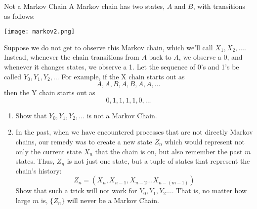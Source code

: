 \documentclass[11.5pt]{article}
\begin{document}
\begin{exercise} {Not a Markov Chain}
A Markov chain has two states, $A$ and $B$, with transitions as follows:
\begin{center}
\texttt{[image: markov2.png]}
\end{center}

Suppose we do not get to observe this Markov chain, which we'll call $X_1, X_2, \ldots$.  Instead, whenever the chain transitions from $A$ back to $A$, we observe a 0, and whenever it changes states, we observe a 1. Let the sequence of 0's and 1's be called $Y_0, Y_1, Y_2, \ldots $
For example, if the X chain starts out as
$$A, A, B, A, B, A, A, \ldots$$
then the Y chain starts out as
$$0, 1, 1, 1, 1, 0, \ldots$$

\begin{enumerate}
\item Show that $Y_0, Y_1, Y_2, \ldots$ is not a Markov Chain. 

\item In the past, when we have encountered processes that are not directly Markov chains, our remedy was to create a new state $Z_n$ which would represent not only the current state $X_n$ that the chain is on, but also remember the past $m$ states. Thus, $Z_n$ is not just one state, but a tuple of states that represent the chain's history: 
$$ Z_n = \left(X_n, X_{n-1}, X_{n-2} \ldots X_{n - (m-1)} \right)$$
Show that such a trick will not work for $Y_0, Y_1, Y_2\ldots$. That is, no matter how large $m$ is, $\{Z_n\}$ will never be a Markov Chain. 
\end{enumerate}
\end{exercise}
\end{document}
